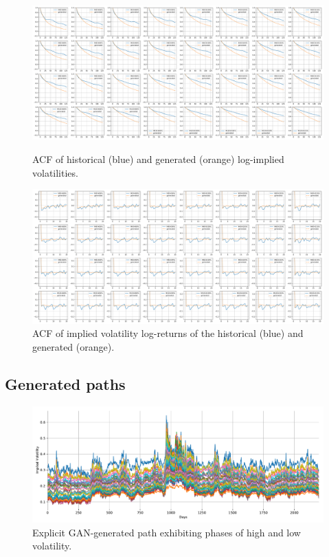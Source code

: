 \documentclass[]{article} %
\begin{document}
\begin{figure}[!htb]
    \centering
    \begin{minipage}{.45\textwidth}
        \centering
        \includegraphics[width=\textwidth]{figures/imp_vol/plot/acf.pdf}
        \caption{ACF of historical (blue) and generated (orange) log-implied volatilities.}
       \label{fig:direct_gan_acf}
    \end{minipage}%
	\hfill
    \begin{minipage}{.45\textwidth}
         \centering
        \includegraphics[width=\textwidth]{figures/imp_vol/plot/acf_diff.pdf}
        \caption{ACF of implied volatility log-returns of the historical (blue) and generated (orange).}
       \label{fig:direct_gan_acf_logrtn}
    \end{minipage}
\end{figure}

\subsection{Generated paths}
\begin{figure}[!htb]
        \centering
        \includegraphics[width=\textwidth]{figures/imp_vol/plot/generated.pdf}
        \caption{Explicit GAN-generated path exhibiting phases of high and low volatility.}
        \label{fig:generated_implied_vols}
\end{figure}
\end{document}
